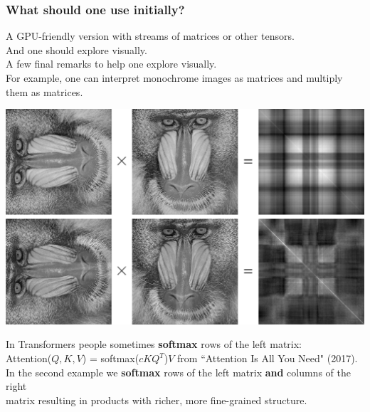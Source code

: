 \documentclass{beamer}
\newcommand{\msmagenta}[1]{{\color{mymagenta} #1}}
\begin{document}
\begin{frame}

  \frametitle{What should one use initially?}

A GPU-friendly version with streams of matrices or other tensors.\\[4ex]

And one should explore visually.\\[4ex]

A few final remarks to help one explore visually.\\[4ex]

\msmagenta{For example, one can interpret monochrome images
as matrices and multiply them as matrices.}

\end{frame}

\begin{frame}

\includegraphics[scale=0.18]{p12}

{\scriptsize In Transformers people sometimes {\bf softmax} rows of the left matrix:\\[-0.1ex]
Attention($Q, K, V$) = softmax($cKQ^T$)$V$ from ``Attention Is All You Need" (2017).\\[-0.5ex]
In the second example we {\bf softmax} rows of the left matrix {\bf and} columns of the right}\\[-0.8ex]
{\scriptsize matrix resulting in products with richer, more fine-grained structure.}


\end{frame}
\end{document}

